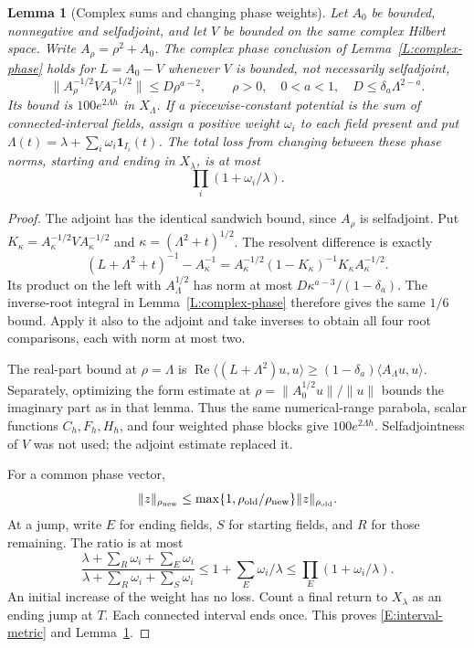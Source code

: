 \documentclass[12pt]{article}
\numberwithin{equation}{section}
\newtheorem{lemma}[theorem]{Lemma}
\theoremstyle{definition}
\begin{document}
\begin{lemma}[Complex sums and changing phase weights]
  \label{L:interval-complex}
  Let $A_0$ be bounded, nonnegative and selfadjoint, and let $V$ be bounded
  on the same complex Hilbert space. Write $A_\rho=\rho^2+A_0$.
  The complex phase conclusion of Lemma~\ref{L:complex-phase} holds
  for $L=A_0-V$ whenever $V$ is bounded, not necessarily selfadjoint,
  \[
    \|A_\rho^{-1/2}VA_\rho^{-1/2}\|\le D\rho^{a-2},\qquad \rho>0,
    \quad 0<a<1,\quad D\le\delta_a\Lambda^{2-a}.
  \]
  Its bound is $100e^{2\Lambda h}$ in $X_\Lambda$.
  If a piecewise-constant potential is the sum of connected-interval
  fields, assign a positive weight $\omega_i$ to each field present
  and put $\Lambda(t)=\lambda+\sum_i\omega_i\mathbf1_{I_i}(t)$.
  The total loss from changing between these phase norms, starting
  and ending in $X_\lambda$, is at most
  \begin{equation}\label{E:interval-metric}
    \prod_i(1+\omega_i/\lambda).
  \end{equation}
\end{lemma}

\begin{proof}
  The adjoint has the identical sandwich bound, since $A_\rho$ is
  selfadjoint. Put $K_\kappa=A_\kappa^{-1/2}VA_\kappa^{-1/2}$ and
  $\kappa=(\Lambda^2+t)^{1/2}$. The resolvent difference is exactly
  \[
    (L+\Lambda^2+t)^{-1}-A_\kappa^{-1}
    =A_\kappa^{-1/2}(1-K_\kappa)^{-1}K_\kappa A_\kappa^{-1/2}.
  \]
  Its product on the left with $A_\Lambda^{1/2}$ has norm at most
  $D\kappa^{a-3}/(1-\delta_a)$. The inverse-root integral in
  Lemma~\ref{L:complex-phase} therefore gives the same $1/6$ bound.
  Apply it also to the adjoint and take inverses to obtain all four
  root comparisons, each with norm at most two.

  The real-part bound at $\rho=\Lambda$ is
  $\operatorname{Re}\langle(L+\Lambda^2)u,u\rangle
  \ge(1-\delta_a)\langle A_\Lambda u,u\rangle$.
  Separately, optimizing the form estimate at
  $\rho=\|A_0^{1/2}u\|/\|u\|$ bounds the imaginary part as in that
  lemma. Thus the same numerical-range parabola, scalar functions
  $C_h,F_h,H_h$, and four weighted phase blocks give $100e^{2\Lambda h}$.
  Selfadjointness of $V$ was not used; the adjoint estimate replaced it.

  For a common phase vector,
  \[
    \|z\|_{\rho_{\rm new}}
    \le\max\{1,\rho_{\rm old}/\rho_{\rm new}\}\|z\|_{\rho_{\rm old}}.
  \]
  At a jump, write $E$ for ending fields, $S$ for starting fields,
  and $R$ for those remaining. The ratio is at most
  \[
    \frac{\lambda+\sum_R\omega_i+\sum_E\omega_i}
    {\lambda+\sum_R\omega_i+\sum_S\omega_i}
    \le1+\sum_E\omega_i/\lambda
    \le\prod_E(1+\omega_i/\lambda).
  \]
  An initial increase of the weight has no loss. Count a final return
  to $X_\lambda$ as an ending jump at $T$.
  Each connected interval ends once. This proves
  \eqref{E:interval-metric} and Lemma~\ref{L:interval-complex}.
\end{proof}
\end{document}
